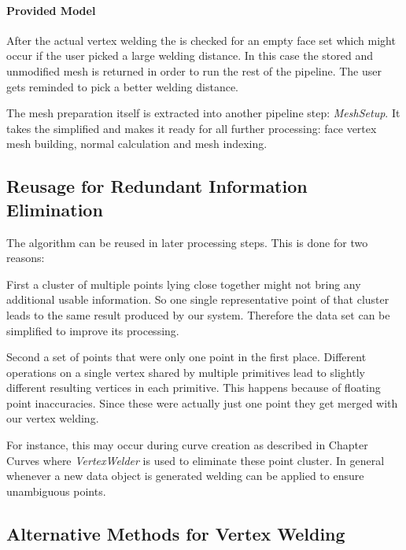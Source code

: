 \documentclass[../ClassicThesis.tex]{subfiles}
\begin{document}
\paragraph{Provided Model}

After the actual vertex welding the {\threedmodel} is checked for an empty face set which might occur if the user picked a large welding distance. In this case the stored and unmodified mesh is returned in order to run the rest of the pipeline. The user gets reminded to pick a better welding distance.

The mesh preparation itself is extracted into another pipeline step: \emph{MeshSetup}. It takes the simplified {\threedmodel} and makes it ready for all further processing: face vertex mesh building, normal calculation and mesh indexing.



\subsection{Reusage for Redundant Information Elimination}

The algorithm can be reused in later processing steps. This is done for two reasons:

First a cluster of multiple points lying close together might not bring any additional usable information. So one single representative point of that cluster leads to the same result produced by our system. Therefore the data set can be simplified to improve its processing.

Second a set of points that were only one point in the first place. Different operations on a single vertex shared by multiple primitives lead to slightly different resulting vertices in each primitive. This happens because of floating point inaccuracies. Since these were actually just one point they get merged with our vertex welding.

For instance, this may occur during curve creation as described in Chapter~ Curves where \emph{VertexWelder} is used to eliminate these point cluster. In general whenever a new data object is generated welding can be applied to ensure unambiguous points.





\subsection{Alternative Methods for Vertex Welding}
\end{document}
